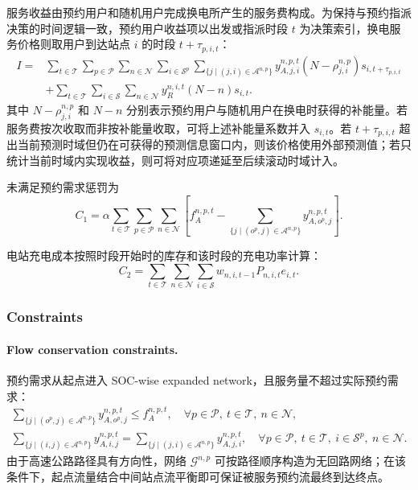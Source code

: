 \documentclass[12pt,hyperref,a4paper,UTF8]{ctexart}
\begin{document}
服务收益由预约用户和随机用户完成换电所产生的服务费构成。为保持与预约指派决策的时间逻辑一致，预约用户收益项以出发或指派时段 $t$ 为决策索引，换电服务价格则取用户到达站点 $i$ 的时段 $t+\tau_{p,i,t}$：
\begin{equation}
\begin{aligned}
I=&
\sum_{t\in\mathcal{T}}\sum_{p\in\mathcal{P}}\sum_{n\in\mathcal{N}}
\sum_{i\in\mathcal{S}^{p}}
\sum_{\{j\mid (j,i)\in\mathcal{A}^{n,p}\}}
 y_{A,j,i}^{n,p,t}
\left(N-\rho_{j,i}^{n,p}\right)s_{i,t+\tau_{p,i,t}}
\\
&+
\sum_{t\in\mathcal{T}}\sum_{i\in\mathcal{S}}\sum_{n\in\mathcal{N}}
y_R^{n,i,t}(N-n)s_{i,t}.
\end{aligned}
\label{eq:income}
\end{equation}
其中 $N-\rho_{j,i}^{n,p}$ 和 $N-n$ 分别表示预约用户与随机用户在换电时获得的补能量。若服务费按次收取而非按补能量收取，可将上述补能量系数并入 $s_{i,t}$。若 $t+\tau_{p,i,t}$ 超出当前预测时域但仍在可获得的预测信息窗口内，则该价格使用外部预测值；若只统计当前时域内实现收益，则可将对应项递延至后续滚动时域计入。

未满足预约需求惩罚为
\begin{equation}
C_1 = \alpha \sum_{t\in \mathcal{T}} \sum_{p\in \mathcal{P}}  \sum_{n\in \mathcal{N}} 
\left[
f_A^{n,p,t} - \sum_{\{j \mid (o^p,j) \in \mathcal{A}^{n,p}\}} y_{A,o^p,j}^{n,p,t} \right].
\label{eq:penaltycost}
\end{equation}

电站充电成本按照时段开始时的库存和该时段的充电功率计算：
\begin{equation}
C_2 = \sum_{t \in \mathcal{T}}  \sum_{n \in \mathcal{N}} \sum_{i \in \mathcal{S}}
 w_{n,i,t-1}P_{n,i,t}e_{i,t}.
\label{eq:chargingcost}
\end{equation}

\subsubsection{Constraints}

\paragraph{Flow conservation constraints.}
预约需求从起点进入 SOC-wise expanded network，且服务量不超过实际预约需求：
\begin{subequations}
\label{eq:flow}
\begin{gather}
\sum_{\{j\mid (o^p,j)\in \mathcal{A}^{n,p}\}}{y_{A,o^p,j}^{n,p,t}} \leq f_A^{n,p,t},
\quad \forall p\in \mathcal{P},\ t\in \mathcal{T},\ n \in \mathcal{N},\label{eq:flow1}\\
\sum_{\{j\mid (i,j)\in \mathcal{A}^{n,p}\}}{y_{A,i,j}^{n,p,t}} =
\sum_{\{j\mid (j,i)\in \mathcal{A}^{n,p}\}}{y_{A,j,i}^{n,p,t}},
\quad \forall p\in \mathcal{P},\ t\in \mathcal{T},\ i\in \mathcal{S}^p,
\ n\in\mathcal{N}.
\label{eq:flow2}
\end{gather}
\end{subequations}
由于高速公路路径具有方向性，网络 $\mathcal{G}^{n,p}$ 可按路径顺序构造为无回路网络；在该条件下，起点流量结合中间站点流平衡即可保证被服务预约流最终到达终点。
\end{document}
